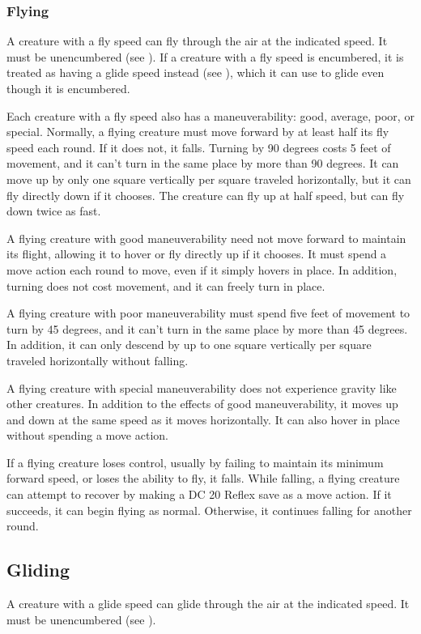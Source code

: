 \subsubsection{Flying}\label{Flying}
A creature with a fly speed can fly through the air at the indicated speed. It must be unencumbered (see ). If a creature with a fly speed is encumbered, it is treated as having a glide speed instead (see ), which it can use to glide even though it is encumbered.

Each creature with a fly speed also has a maneuverability: good, average, poor, or special. Normally, a flying creature must move forward by at least half its fly speed each round. If it does not, it falls. Turning by 90 degrees costs 5 feet of movement, and it can't turn in the same place by more than 90 degrees. It can move up by only one square vertically per square traveled horizontally, but it can fly directly down if it chooses. The creature can fly up at half speed, but can fly down twice as fast.

 A flying creature with good maneuverability need not move forward to maintain its flight, allowing it to hover or fly directly up if it chooses. It must spend a move action each round to move, even if it simply hovers in place. In addition, turning does not cost movement, and it can freely turn in place.

 A flying creature with poor maneuverability must spend five feet of movement to turn by 45 degrees, and it can't turn in the same place by more than 45 degrees. In addition, it can only descend by up to one square vertically per square traveled horizontally without falling.

 A flying creature with special maneuverability does not experience gravity like other creatures. In addition to the effects of good maneuverability, it moves up and down at the same speed as it moves horizontally. It can also hover in place without spending a move action.

 If a flying creature loses control, usually by failing to maintain its minimum forward speed, or loses the ability to fly, it falls. While falling, a flying creature can attempt to recover by making a DC 20 Reflex save as a move action. If it succeeds, it can begin flying as normal. Otherwise, it continues falling for another round.

\subsection{Gliding}\label{Gliding}
A creature with a glide speed can glide through the air at the indicated speed. It must be unencumbered (see ).

